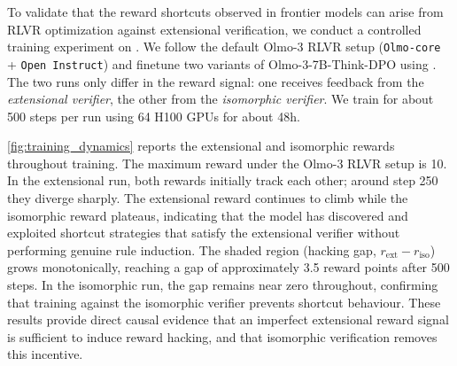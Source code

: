 To validate that the reward shortcuts observed in frontier models can arise from RLVR optimization against extensional verification, we conduct a controlled training experiment on \benchmark. We follow the default Olmo-3 RLVR setup (\texttt{Olmo-core} + \texttt{Open Instruct}) \cite{olmo2025olmo3} and finetune two variants of Olmo-3-7B-Think-DPO using \benchmark\cite{helff2025slr}. The two runs only differ in the reward signal: one receives feedback from the \emph{extensional verifier}, the other from the \emph{isomorphic verifier}. We train for about 500 steps per run using 64 H100 GPUs for about 48h.

\autoref{fig:training_dynamics} reports the extensional and isomorphic rewards throughout training. The maximum reward under the Olmo-3 RLVR setup is 10. In the extensional run, both rewards initially track each other; around step 250 they diverge sharply. The extensional reward continues to climb while the isomorphic reward plateaus, indicating that the model has discovered and exploited shortcut strategies that satisfy the extensional verifier without performing genuine rule induction. The shaded region (hacking gap, $r_{\text{ext}} - r_{\text{iso}}$) grows monotonically, reaching a gap of approximately 3.5 reward points after 500 steps. In the isomorphic run, the gap remains near zero throughout, confirming that training against the isomorphic verifier prevents shortcut behaviour. These results provide direct causal evidence that an imperfect extensional reward signal is sufficient to induce reward hacking, and that isomorphic verification removes this incentive.

